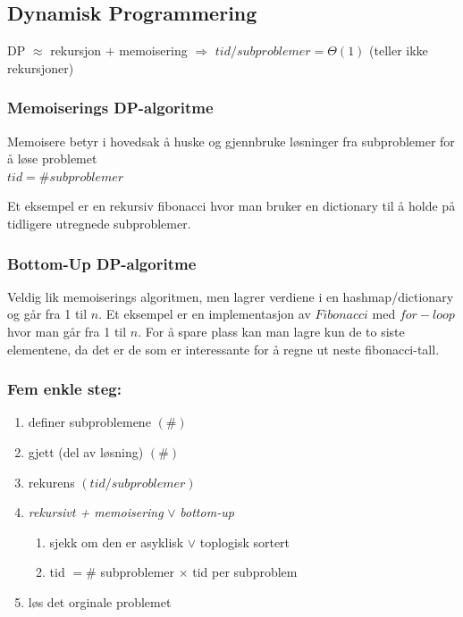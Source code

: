 \documentclass[a4paper, norsk,  10pt]{article}
\begin{document}
{{\begin{algorithmic}
\section{Dynamisk Programmering}

DP $\approx$ rekursjon $+$ memoisering $\Rightarrow$ $tid/subproblemer =  \Theta(1)$ (teller ikke rekursjoner)

\subsubsection{Memoiserings DP-algoritme}

Memoisere betyr i hovedsak å huske og gjennbruke løsninger fra subproblemer for å løse problemet \\
\noindent $tid = \#subproblemer$ 

\noindent Et eksempel er en rekursiv fibonacci hvor man bruker en dictionary til å holde på tidligere utregnede subproblemer. 

\subsubsection{Bottom-Up DP-algoritme}

Veldig lik memoiserings algoritmen, men lagrer verdiene i en hashmap/dictionary og går fra 1 til $n$. Et eksempel er en implementasjon av $Fibonacci$ med $for-loop$ hvor man går fra 1 til $n$. For å spare plass kan man lagre kun de to siste elementene, da det er de som er interessante for å regne ut neste fibonacci-tall. 

\subsubsection{Fem enkle steg:}

\begin{enumerate}
\item definer subproblemene $(\#)$
\item gjett (del av løsning) $(\#)$
\item rekurens $(tid/subproblemer)$
\item \textit{rekursivt + memoisering} $\vee$ \textit{bottom-up}
\begin{enumerate}
	\item sjekk om den er asyklisk $\vee$ toplogisk sortert
	\item tid $= \#$ subproblemer $\times$ tid per subproblem
\end{enumerate}
\item løs det orginale problemet
\end{enumerate}


\end{algorithmic}}}
\end{document}
